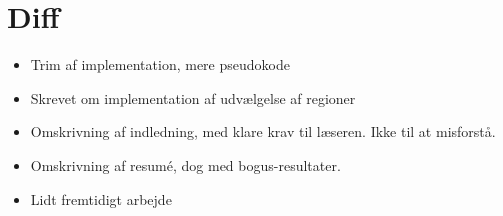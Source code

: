 {
\section*{Diff}
\begin{itemize}
    \item Trim af implementation, mere pseudokode
    \item Skrevet om implementation af udvælgelse af regioner
    \item Omskrivning af indledning, med klare krav til læseren. Ikke
        til at misforstå.
    \item Omskrivning af resumé, dog med bogus-resultater.
    \item Lidt fremtidigt arbejde
\end{itemize}
}

